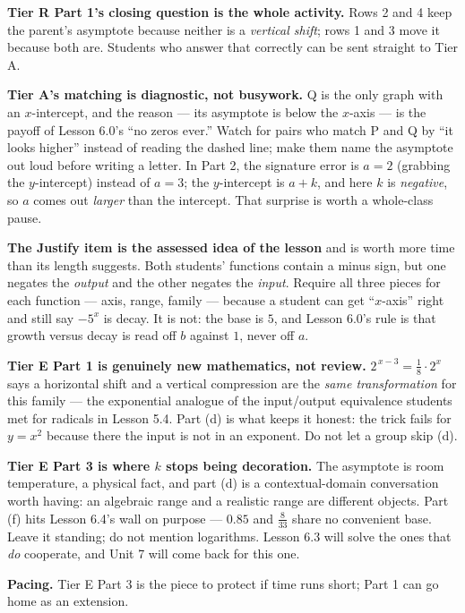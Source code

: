 \documentclass[10pt]{article}
\begin{document}
\begin{teachernote}
\textbf{Tier R Part 1's closing question is the whole activity.} Rows 2 and 4 keep the parent's
asymptote because neither is a \emph{vertical shift}; rows 1 and 3 move it because both are. Students
who answer that correctly can be sent straight to Tier A.

\textbf{Tier A's matching is diagnostic, not busywork.} Q is the only graph with an $x$-intercept, and
the reason --- its asymptote is below the $x$-axis --- is the payoff of Lesson 6.0's ``no zeros ever.''
Watch for pairs who match P and Q by ``it looks higher'' instead of reading the dashed line; make them
name the asymptote out loud before writing a letter. In Part 2, the signature error is $a=2$ (grabbing
the $y$-intercept) instead of $a=3$; the $y$-intercept is $a+k$, and here $k$ is \emph{negative}, so
$a$ comes out \emph{larger} than the intercept. That surprise is worth a whole-class pause.

\textbf{The Justify item is the assessed idea of the lesson} and is worth more time than its length
suggests. Both students' functions contain a minus sign, but one negates the \emph{output} and the
other negates the \emph{input}. Require all three pieces for each function --- axis, range, family ---
because a student can get ``$x$-axis'' right and still say $-5^{x}$ is decay. It is not: the base is
$5$, and Lesson 6.0's rule is that growth versus decay is read off $b$ against $1$, never off $a$.

\textbf{Tier E Part 1 is genuinely new mathematics, not review.} $2^{\,x-3}=\frac18\cdot 2^{x}$ says a
horizontal shift and a vertical compression are the \emph{same transformation} for this family --- the
exponential analogue of the input/output equivalence students met for radicals in Lesson 5.4. Part (d)
is what keeps it honest: the trick fails for $y=x^{2}$ because there the input is not in an exponent.
Do not let a group skip (d).

\textbf{Tier E Part 3 is where $k$ stops being decoration.} The asymptote is room temperature, a
physical fact, and part (d) is a contextual-domain conversation worth having: an algebraic range and a
realistic range are different objects. Part (f) hits Lesson 6.4's wall on purpose --- $0.85$ and
$\frac{8}{33}$ share no convenient base. Leave it standing; do not mention logarithms. Lesson 6.3 will
solve the ones that \emph{do} cooperate, and Unit 7 will come back for this one.

\textbf{Pacing.} Tier E Part 3 is the piece to protect if time runs short; Part 1 can go home as an
extension.
\end{teachernote}
\end{document}
